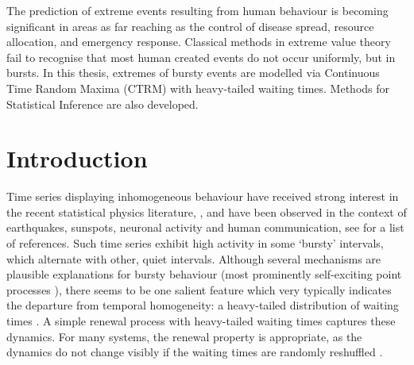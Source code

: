 \documentclass[honours,12pt,twoside, openright]{unswthesis}
\newcommand{\1}{\mathbf 1}
\newcommand\blankpage{%
    \null
    \thispagestyle{empty}%
    \addtocounter{page}{-1}%
    \newpage}
\numberwithin{equation}{section}
\theoremstyle{definition}
\theoremstyle{remark}
\begin{document}
\afterpage{\blankpage}



The prediction of extreme events resulting from human
behaviour is becoming significant in areas as far reaching as the
control of disease spread, resource allocation, and emergency
response.  Classical methods in extreme value theory fail to recognise
that most human created events do not occur uniformly, but in bursts.
In this thesis, 
extremes of bursty events are modelled via Continuous Time Random Maxima
(CTRM) with heavy-tailed waiting times.  Methods for Statistical Inference
are also developed. 

\afterpage{\blankpage}


\afterpreface

%
%

\afterpage{\blankpage}

\chapter{Introduction}\label{s-intro}
Time series displaying inhomogeneous behaviour have received strong interest in 
the recent statistical physics literature,
\cite{Barabasi2005,Oliveira2005,Vasquez2006,Vazquez2007,Omi2011,
Min2010,Karsai2011,Bagrow2013},
and have been observed in the context of earthquakes, sunspots, neuronal
activity and human communication, see \cite{Karsai2012,Vajna2013} for a 
list of references.
Such time series exhibit high activity in some `bursty' intervals, which 
alternate with other, quiet intervals.  Although several mechanisms are 
plausible explanations for bursty behaviour
(most prominently self-exciting point processes \cite{hawkes1971point}),
there seems to be one salient
feature which very typically indicates the departure from temporal homogeneity: 
a heavy-tailed distribution of waiting times
\cite{Vasquez2006,Karsai2012,Vajna2013}. 
A simple renewal process with heavy-tailed waiting times captures these
dynamics. For many systems, the renewal property is appropriate, as the dynamics do not change visibly if the
waiting times are randomly reshuffled \cite{Karsai2012}.
\end{document}
